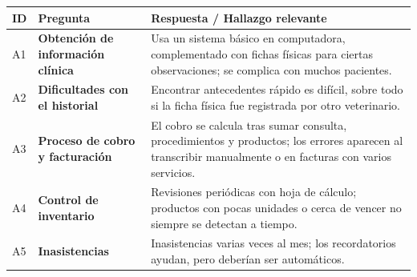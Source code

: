 \documentclass[
]{article}
\newcounter{none} %
\begin{document}
{\def\LTcaptype{none} %
\begin{longtable}[]{|
  >{\centering\arraybackslash}p{}|
  >{\raggedright\arraybackslash}p{}|
  >{\raggedright\arraybackslash}p{}|}
\hline
\begin{minipage}[b]{\linewidth}\centering
\textbf{ID}
\end{minipage} & \begin{minipage}[b]{\linewidth}\centering
\textbf{Pregunta}
\end{minipage} & \begin{minipage}[b]{\linewidth}\raggedright
\textbf{Respuesta / Hallazgo relevante}
\end{minipage} \\
\hline
\endhead
\hline
\endlastfoot
A1 & \textbf{Obtención de información clínica} &
\begin{minipage}[t]{\linewidth}\raggedright
Usa un sistema básico en computadora, complementado con fichas físicas para ciertas observaciones; se complica con muchos pacientes.
\end{minipage} \\
\hline
A2 & \textbf{Dificultades con el historial} &
\begin{minipage}[t]{\linewidth}\raggedright
Encontrar antecedentes rápido es difícil, sobre todo si la ficha física fue registrada por otro veterinario.
\end{minipage} \\
\hline
A3 & \textbf{Proceso de cobro y facturación} &
\begin{minipage}[t]{\linewidth}\raggedright
El cobro se calcula tras sumar consulta, procedimientos y productos; los errores aparecen al transcribir manualmente o en facturas con varios servicios.
\end{minipage} \\
\hline
A4 & \textbf{Control de inventario} &
\begin{minipage}[t]{\linewidth}\raggedright
Revisiones periódicas con hoja de cálculo; productos con pocas unidades o cerca de vencer no siempre se detectan a tiempo.
\end{minipage} \\
\hline
A5 & \textbf{Inasistencias} &
\begin{minipage}[t]{\linewidth}\raggedright
Inasistencias varias veces al mes; los recordatorios ayudan, pero deberían ser automáticos.
\end{minipage} \\

\end{longtable}}
\end{document}
